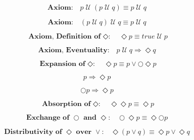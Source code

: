 \documentclass[fleqn, leqno]{article}
\newcommand{\until}{\;\mathcal{U}\;}
\newcommand{\next}{\bigcirc}
\newcommand{\event}{\Diamond}
\newcommand{\spacer}{\vspace{-30pt}}
\begin{document}
\spacer

\begin{equation}\label{E:untilIdem}
\textbf{Axiom:}\quad p \until (p \until q) \equiv p \until q
\end{equation}

\spacer

\begin{equation}\label{E:untilIdemR}
\textbf{Axiom:}\quad (p \until q) \until q \equiv p \until q
\end{equation}

\spacer

\begin{equation}\label{E:defEvent}
\textbf{Axiom, Definition of $\event$:}\quad \event p \equiv true \until p
\end{equation}

\spacer

\begin{equation}\label{E:eventuality}
\textbf{Axiom, Eventuality:}\quad p \until q \Rightarrow \event q
\end{equation}

\spacer

\begin{equation}\label{E:expansionEvent}
\textbf{Expansion of $\event$:}\quad \event p \equiv p \lor \next\event p
\end{equation}

\spacer

\begin{equation}\label{E:impEvent}
p \Rightarrow \event p
\end{equation}

\spacer

\begin{equation}\label{E:nextEvent}
\next p \Rightarrow \event p
\end{equation}

\spacer

\begin{equation}\label{E:IdemEvent}
\textbf{Absorption of $\event$:}\quad \event\event p \equiv \event p
\end{equation}

\spacer

\begin{equation}\label{E:dNextEvent}
\textbf{Exchange of $\next$ and $\event$:}\quad \next\event p \equiv \event\next p
\end{equation}

\spacer

\begin{equation}\label{E:distEventOr}
\textbf{Distributivity of $\event$ over $\lor$:}\quad \event(p \lor q) \equiv \event p \lor \event q
\end{equation}
\end{document}
